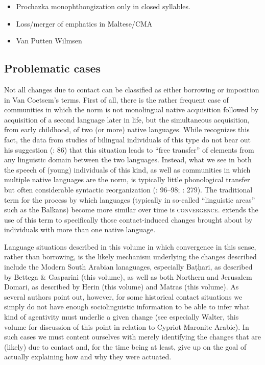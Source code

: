 \documentclass[output=paper]{langsci/langscibook}
\begin{document}
\begin{itemize}
    \item Prochazka monophthongization only in closed syllables.
    \item Loss/merger of emphatics in Maltese/CMA
    \item Van Putten Wilmsen
\end{itemize}




\subsection{Problematic cases}\label{introproblem}
Not all changes due to contact can be classified as either borrowing or imposition in Van Coetsem's terms. First of all, there is the rather frequent case of communities in which the norm is not monolingual native acquisition followed by acquisition of a second language later in life, but the simultaneous acquisition, from early childhood, of two (or more) native languages. While \citet{VanCoetsem2000} recognizes this fact, the data from studies of bilingual individuals of this type do not bear out his suggestion (\citeyear{VanCoetsem2000}: 86) that this situation leads to ``free transfer'' of elements from any linguistic domain between the two languages. Instead, what we see in both the speech of (young) individuals of this kind, as well as communities in which multiple native languages are the norm, is typically little phonological transfer but often considerable syntactic reorganization (\citealt{Lucas2009}: 96--98; \citeyear{Lucas2012}: 279). The traditional term for the process by which languages (typically in so-called ``linguistic areas'' such as the Balkans) become more similar over time is \textsc{convergence}. \citet{Lucas2015} extends the use of this term to specifically those contact-induced changes brought about by individuals with more than one native language. 

Language situations described in this volume in which convergence in this sense, rather than borrowing, is the likely mechanism underlying the changes described include the Modern South Arabian lanaguages, especially Baṭḥari, as described by Bettega \& Gasparini (this volume), as well as both Northern and Jerusalem Domari, as described by Herin (this volume) and Matras (this volume). As several authors point out, however, for some historical contact situations we simply do not have enough sociolinguistic information to be able to infer what kind of agentivity must underlie a given change (see especially Walter, this volume for discussion of this point in relation to Cypriot Maronite Arabic). In such cases we must content ourselves with merely identifying the changes that are (likely) due to contact and, for the time being at least, give up on the goal of actually explaining how and why they were actuated.
\end{document}
